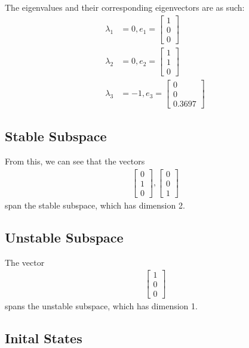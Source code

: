 \documentclass[]{article}
\begin{document}
The eigenvalues and their corresponding eigenvectors are as such:
\begin{align*}
	\lambda_1 &= 0, e_1 = \begin{bmatrix}
	1 \\
	0 \\
	0
	\end{bmatrix}\\
	\lambda_2 &= 0, e_2 = \begin{bmatrix}
	1 \\
	1 \\
	0
	\end{bmatrix} \\
	\lambda_3 &= -1, e_3 = \begin{bmatrix}
	0 \\
	0 \\
	0.3697
	\end{bmatrix}
\end{align*}

\subsection{Stable Subspace}

From this, we can see that the vectors 
\begin{align*}
	\begin{bmatrix}
	0 \\
	1 \\
	0
	\end{bmatrix}, \begin{bmatrix}
	0 \\
	0 \\
	1
	\end{bmatrix}
\end{align*}
span the stable subspace, which has dimension 2.

\subsection{Unstable Subspace}

The vector
\begin{align*}
	\begin{bmatrix}
	1 \\
	0 \\
	0
	\end{bmatrix}
\end{align*}
spans the unstable subspace, which has dimension 1.

\subsection{Inital States}
\end{document}
